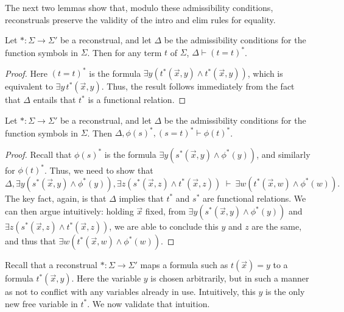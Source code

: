 The next two lemmas show that, modulo these admissibility conditions,
reconstruals preserve the validity of the intro and elim rules for
equality.

\begin{lemma} Let $\ast :\Sigma\to \Sigma '$ be a reconstrual, and let
  $\Delta$ be the admissibility conditions for the function symbols in
  $\Sigma$.  Then for any term $t$ of $\Sigma$,
  $\Delta \vdash (t=t)^*$. \end{lemma}

\begin{proof} Here $(t=t)^*$ is the formula
  $\exists y (t^*(\vec{x},y)\wedge t^*(\vec{x},y))$, which is
  equivalent to $\exists y\,t^*(\vec{x},y)$.  Thus, the result follows
  immediately from the fact that $\Delta$ entails that $t^*$ is a
  functional relation.
\end{proof}

\begin{lemma} Let $\ast :\Sigma\to \Sigma '$ be a reconstrual, and let
  $\Delta$ be the admissibility conditions for the function symbols in
  $\Sigma$.  Then
  $\Delta ,\phi (s)^\ast ,(s=t)^\ast \vdash \phi
  (t)^\ast$.  \end{lemma}

\begin{proof} Recall that $\phi (s)^*$ is the formula
  $\exists y(s^*(\vec{x},y)\wedge \phi ^*(y))$, and similarly for
  $\phi (t)^*$.  Thus, we need to show that
  \[ \Delta ,\exists y(s^*(\vec{x},y)\wedge \phi ^*(y)),\exists
    z(s^*(\vec{x},z)\wedge t^*(\vec{x},z)) \; \vdash \: \exists
    w(t^*(\vec{x},w)\wedge \phi ^*(w)) .\] The key fact, again, is
  that $\Delta$ implies that $t^*$ and $s^*$ are functional relations.
  We can then argue intuitively: holding $\vec{x}$ fixed, from
  $\exists y(s^*(\vec{x},y)\wedge \phi ^*(y))$ and
  $\exists z(s^*(\vec{x},z)\wedge t^*(\vec{x},z))$, we are able to
  conclude this $y$ and $z$ are the same, and thus that
  $\exists w(t^*(\vec{x},w)\wedge \phi ^*(w))$.
\end{proof}






Recall that a reconstrual $\ast :\Sigma\to\Sigma '$ maps a formula
such as $t(\vec{x})=y$ to a formula $t^*(\vec{x},y)$.  Here the
variable $y$ is chosen arbitrarily, but in such a manner as not to
conflict with any variables already in use.  Intuitively, this $y$ is
the only new free variable in $t^*$.  We now validate that intuition.

